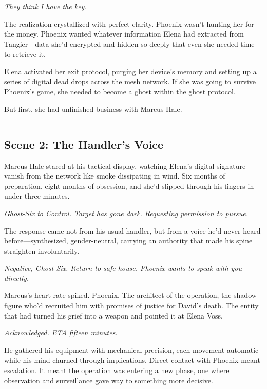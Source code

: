\emph{They think I have the key.}

The realization crystallized with perfect clarity. Phoenix wasn't hunting her for the money. Phoenix wanted whatever information Elena had extracted from Tangier---data she'd encrypted and hidden so deeply that even she needed time to retrieve it.

Elena activated her exit protocol, purging her device's memory and setting up a series of digital dead drops across the mesh network. If she was going to survive Phoenix's game, she needed to become a ghost within the ghost protocol.

But first, she had unfinished business with Marcus Hale.

\begin{center}\rule{0.5\linewidth}{0.5pt}\end{center}

\hypertarget{scene-2-the-handlers-voice}{%
\subsection{Scene 2: The Handler's Voice}\label{scene-2-the-handlers-voice}}

Marcus Hale stared at his tactical display, watching Elena's digital signature vanish from the network like smoke dissipating in wind. Six months of preparation, eight months of obsession, and she'd slipped through his fingers in under three minutes.

\emph{Ghost-Six to Control. Target has gone dark. Requesting permission to pursue.}

The response came not from his usual handler, but from a voice he'd never heard before---synthesized, gender-neutral, carrying an authority that made his spine straighten involuntarily.

\emph{Negative, Ghost-Six. Return to safe house. Phoenix wants to speak with you directly.}

Marcus's heart rate spiked. Phoenix. The architect of the operation, the shadow figure who'd recruited him with promises of justice for David's death. The entity that had turned his grief into a weapon and pointed it at Elena Voss.

\emph{Acknowledged. ETA fifteen minutes.}

He gathered his equipment with mechanical precision, each movement automatic while his mind churned through implications. Direct contact with Phoenix meant escalation. It meant the operation was entering a new phase, one where observation and surveillance gave way to something more decisive.

